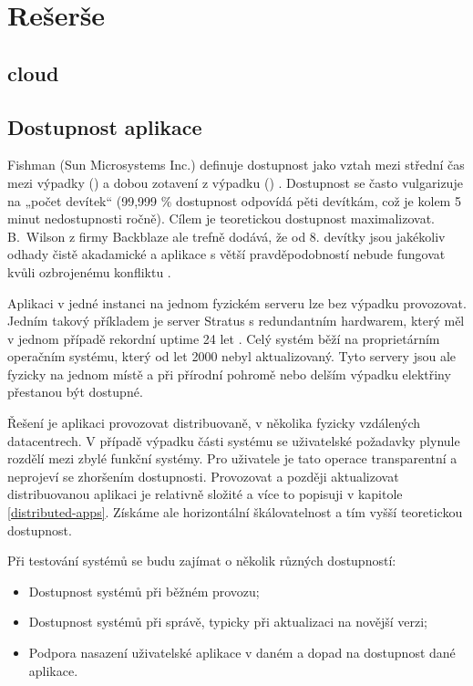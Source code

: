 \chapter{Rešerše}
    \blind[4]

    \section{cloud}
        \blind[2]

    \section{Dostupnost aplikace}
        Fishman (Sun Microsystems Inc.) definuje dostupnost jako vztah mezi střední čas mezi výpadky () a dobou zotavení z výpadku () \cite{fishman-availability}. Dostupnost se často vulgarizuje na „počet devítek“ (99,999 \% dostupnost odpovídá pěti devítkám, což je kolem 5 minut nedostupnosti ročně). Cílem je teoretickou dostupnost maximalizovat. B.~Wilson z firmy Backblaze ale trefně dodává, že od 8. devítky jsou jakékoliv odhady čistě akadamické a aplikace s větší pravděpodobností nebude fungovat kvůli ozbrojenému konfliktu \cite{backblaze-availability}.

        Aplikaci v jedné instanci na jednom fyzickém serveru lze bez výpadku provozovat. Jedním takový příkladem je server Stratus s redundantním hardwarem, který měl v jednom případě rekordní uptime 24 let \cite{thibodeau-longest-uptime}. Celý systém běží na proprietárním operačním systému, který od let 2000 nebyl aktualizovaný. Tyto servery jsou ale fyzicky na jednom místě a při přírodní pohromě nebo delším výpadku elektřiny přestanou být dostupné.

        Řešení je aplikaci provozovat distribuovaně, v několika fyzicky vzdálených datacentrech. V případě výpadku části systému se uživatelské požadavky plynule rozdělí mezi zbylé funkční systémy. Pro uživatele je tato operace transparentní a neprojeví se zhoršením dostupnosti. Provozovat a později aktualizovat distribuovanou aplikaci je relativně složité a více to popisuji v kapitole \ref{distributed-apps}. Získáme ale horizontální škálovatelnost a tím vyšší teoretickou dostupnost.

        Při testování \CICD systémů se budu zajímat o několik různých dostupností:
        \begin{itemize}
            \item Dostupnost \CICD systémů při běžném provozu;
            \item Dostupnost \CICD systémů při správě, typicky při aktualizaci na novější verzi;
            \item Podpora nasazení uživatelské aplikace v daném \CICD a dopad na dostupnost dané aplikace.
        \end{itemize}

